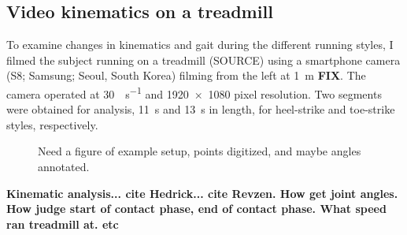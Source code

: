 \subsection{Video kinematics on a treadmill}
To examine changes in kinematics and gait during the different running styles, I filmed the subject running on a treadmill (SOURCE) using a smartphone camera (S8; Samsung; Seoul, South Korea) filming from the left at \SI{1}{\meter} \textbf{FIX}. The camera operated at \SI{30}{\frame\per\second} and \num{1920x1080} pixel resolution. Two segments were obtained for analysis, \SI{11}{\second} and \SI{13}{\second} in length, for heel-strike and toe-strike styles, respectively.
\begin{figure}
\caption{Need a figure of example setup, points digitized, and maybe angles annotated.}
\label{fig:methods:kinematics}
\end{figure}

\textbf{Kinematic analysis... cite Hedrick... cite Revzen. How get joint angles. How judge start of contact phase, end of contact phase. What speed ran treadmill at. etc}